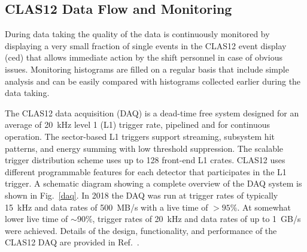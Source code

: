 \documentclass[final,3p,twocolumn]{elsarticle}
\begin{document}
\subsection {CLAS12 Data Flow and Monitoring} 

During data taking the quality of the data is continuously monitored by displaying a very small fraction of single
events in the CLAS12 event display (ced) that allows immediate action by the shift personnel in case of obvious
issues. Monitoring histograms are filled on a regular basis that include simple analysis and can be easily compared
with histograms collected earlier during the data taking.  

The CLAS12 data acquisition (DAQ) is a dead-time free system designed for an average of 20~kHz level 1 (L1) 
trigger rate, pipelined and for continuous operation. The sector-based  L1 triggers support streaming, subsystem
hit patterns, and energy summing with low threshold suppression.  The scalable trigger distribution scheme uses up
to 128 front-end L1 crates. CLAS12 uses different programmable features for each detector that participates in
the L1 trigger. A schematic diagram showing a complete overview of the DAQ system is shown in Fig.~\ref{daq}. In
2018 the DAQ was run at trigger rates of typically 15~kHz and data rates of 500~MB/s with a live time of $> 95\%$.
At somewhat lower live time of $\sim$90\%, trigger rates of 20~kHz and data rates of up to 1~GB/s were achieved.
Details of the design, functionality, and performance of the CLAS12 DAQ are provided in  Ref.~\cite{DAQ}. 
 
\end{document}
